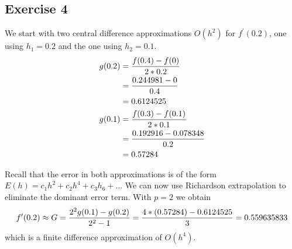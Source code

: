 \documentclass[12pt]{article}
\begin{document}
\subsection{Exercise 4}

We start with two central difference approximations $O(h^2)$ for $f^{\prime}(0.2)$, one using $h_1=0.2$ and the one using $h_2=0.1$.
\begin{align}
g(0.2)&=\frac{f(0.4) - f(0)}{2*0.2} \notag \\
			&=\frac{0.244981 - 0}{0.4} \notag \\
            &=0.6124525 \notag \\
g(0.1)&=\frac{f(0.3) - f(0.1)}{2*0.1} \notag \\
			&=\frac{0.192916 - 0.078348}{0.2} \notag \\
            &=0.57284 \notag
\end{align}

Recall that the error in both approximations is of the form \(E(h) = c_1h^2 + c_2h^4+c_3h_6 +...\) We can now use Richardson extrapolation to eliminate the dominant error term. With $p = 2$ we obtain
\begin{align}
f^{\prime}(0.2) \approx G = \frac{2^2g(0.1)-g(0.2)}{2^2-1} = \frac{4*(0.57284)-0.6124525}{3}
= 0.559635833 \notag
\end{align}
which is a finite difference approximation of \(O(h^4)\).
\end{document}
